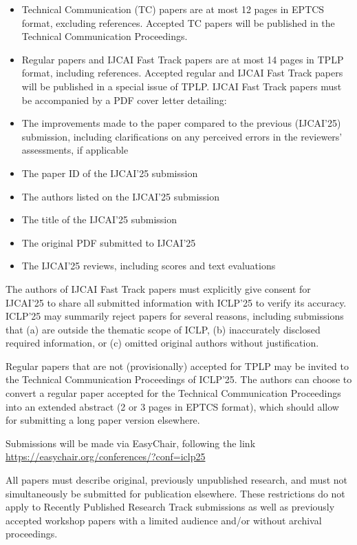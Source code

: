 \documentclass[prodmode,acmtecs]{acmsmall} %
\begin{document}
\begin{itemize}
\begin{itemize}\item  Technical Communication (TC) papers are at most 12 pages in EPTCS format, excluding references. Accepted TC papers will be published in the Technical Communication Proceedings.
\item  Regular papers and IJCAI Fast Track papers are at most 14 pages in TPLP format, including references. Accepted regular and IJCAI Fast Track papers will be published in a special issue of TPLP. IJCAI Fast Track papers must be accompanied by a PDF cover letter detailing:
\item  The improvements made to the paper compared to the previous (IJCAI’25) submission, including clarifications on any perceived errors in the reviewers' assessments, if applicable
\item  The paper ID of the IJCAI’25 submission
\item  The authors listed on the IJCAI’25 submission
\item  The title of the IJCAI’25 submission
\item  The original PDF submitted to IJCAI’25
\item  The IJCAI’25 reviews, including scores and text evaluations
\end{itemize} 
  The authors of IJCAI Fast Track papers must explicitly give consent for IJCAI’25 to share all submitted information with ICLP’25 to verify its accuracy. ICLP’25 may summarily reject papers for several reasons, including submissions that (a) are outside the thematic scope of ICLP, (b) inaccurately disclosed required information, or (c) omitted original authors without justification.   
 
  Regular papers that are not (provisionally) accepted for TPLP may be invited to the Technical Communication Proceedings of ICLP’25. The authors can choose to convert a regular paper accepted for the Technical Communication Proceedings into an extended abstract (2 or 3 pages in EPTCS format), which should allow for submitting a long paper version elsewhere.  
 
  Submissions will be made via EasyChair, following the link \href{https://easychair.org/conferences/?conf=iclp25}{https://easychair.org/conferences/?conf=iclp25} 
 
  All papers must describe original, previously unpublished research, and must not simultaneously be submitted for publication elsewhere. These restrictions do not apply to Recently Published Research Track submissions as well as previously accepted workshop papers with a limited audience and/or without archival proceedings. 
 

\end{itemize}
\end{document}
